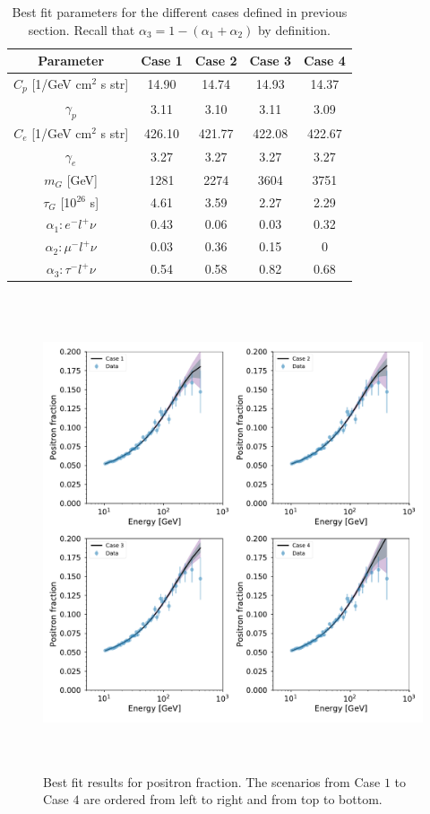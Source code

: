 \documentclass[a4paper,11pt]{article}
\begin{document}
\begin{table}[t]
\centering{}%
\begin{tabular}{|c|c|c|c|c|}
\hline 
 Parameter & Case 1 & Case 2 & Case 3 & Case 4 \tabularnewline
\hline 
\hline 
$C_p$ [1/GeV cm$^2$ s str] & 14.90 & 14.74 & 14.93 & 14.37 \tabularnewline
\hline 
$\gamma_p$ & 3.11 & 3.10 & 3.11 & 3.09  \tabularnewline
\hline 
$C_e$ [1/GeV cm$^2$ s str] & 426.10 & 421.77 & 422.08 & 422.67 \tabularnewline
\hline 
$\gamma_e$ & 3.27 & 3.27 & 3.27 & 3.27 \tabularnewline
\hline 
$m_G$ [GeV] & 1281 & 2274 & 3604 & 3751 \tabularnewline
\hline 
$\tau_G$ [10$^{26}$ s] & 4.61 & 3.59 & 2.27 & 2.29  \tabularnewline
\hline 
$\alpha_1: e^-l^+\nu$  & 0.43 &  0.06 & 0.03 & 0.32 \tabularnewline
\hline 
$\alpha_2: \mu^-l^+\nu $  & 0.03 &  0.36 & 0.15 &  0 \tabularnewline
\hline
\hline
$\alpha_3: \tau^-l^+\nu$  & 0.54 &  0.58 & 0.82 & 0.68 \tabularnewline
\hline 
\end{tabular}
\caption{Best fit parameters for the different cases defined in previous section. Recall that $\alpha_3= 1-(\alpha_1+\alpha_2)$ by definition.}
\label{table:best-fit-summary}
\end{table}

\begin{figure}[htb]
\begin{center}
\includegraphics[height=14cm,width=14cm,angle=0]{Figures/pymultinest_fit_case_5_ep_fraction.pdf}
\caption{Best fit results for positron fraction. The scenarios from Case $1$ to Case $4$ are ordered from left to right and from top to bottom.}
\label{fig:bf-positron-fraction-spectrum}
\end{center}
\end{figure}
\end{document}

